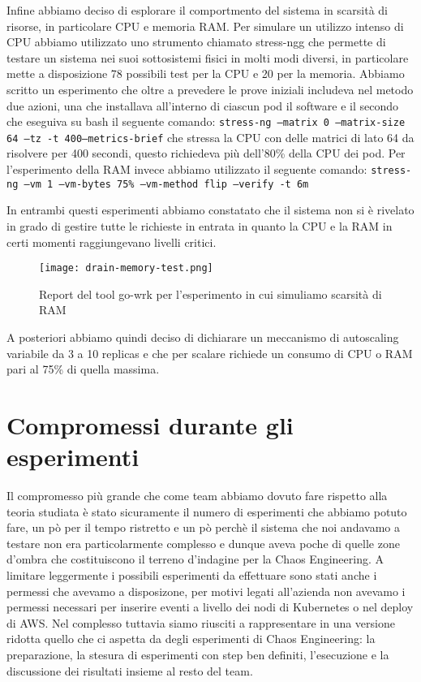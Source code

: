 Infine abbiamo deciso di esplorare il comportmento del sistema in scarsità di risorse, in particolare CPU e memoria RAM.
Per simulare un utilizzo intenso di CPU abbiamo utilizzato uno strumento chiamato \gls{stress-ngg} che permette di testare un sistema nei suoi sottosistemi fisici in molti modi diversi, in particolare mette a disposizione 78 possibili test per la CPU e 20 per la memoria.
Abbiamo scritto un esperimento che oltre a prevedere le prove iniziali includeva nel metodo due azioni, una che installava all'interno di ciascun pod il software e il secondo che eseguiva su bash il seguente comando:
\texttt{stress-ng –matrix 0 –matrix-size 64 –tz -t 400–metrics-brief}
che stressa la CPU con delle matrici di lato 64 da risolvere per 400 secondi, questo richiedeva più dell'80\% della CPU dei pod.
Per l'esperimento della RAM invece abbiamo utilizzato il seguente comando:
\texttt{stress-ng --vm 1 --vm-bytes 75\% --vm-method flip --verify -t 6m}

In entrambi questi esperimenti abbiamo constatato che il sistema non si è rivelato in grado di gestire tutte le richieste in entrata in quanto la CPU e la RAM in certi momenti raggiungevano livelli critici.
\begin{figure}[]
    \centering
    \texttt{[image: drain-memory-test.png]}
    \caption{Report del tool go-wrk per l'esperimento in cui simuliamo scarsità di RAM}
    \label{tab:report-drain-ram}
\end{figure}
A posteriori abbiamo quindi deciso di dichiarare un meccanismo di autoscaling variabile da 3 a 10 replicas e che per scalare richiede un consumo di CPU o RAM pari al 75\% di quella massima.

\section{Compromessi durante gli esperimenti}
Il compromesso più grande che come team abbiamo dovuto fare rispetto alla teoria studiata è stato sicuramente il numero di esperimenti che abbiamo potuto fare, un pò per il tempo ristretto e un pò perchè il sistema che noi andavamo a testare non era particolarmente complesso e dunque aveva poche di quelle zone d'ombra che costituiscono il terreno d'indagine per la Chaos Engineering.
A limitare leggermente i possibili esperimenti da effettuare sono stati anche i permessi che avevamo a disposizone, per motivi legati all'azienda non avevamo i permessi necessari per inserire eventi a livello dei nodi di Kubernetes o nel deploy di AWS.
Nel complesso tuttavia siamo riusciti a rappresentare in una versione ridotta quello che ci aspetta da degli esperimenti di Chaos Engineering: la preparazione, la stesura di esperimenti con step ben definiti, l'esecuzione e la discussione dei risultati insieme al resto del team.

